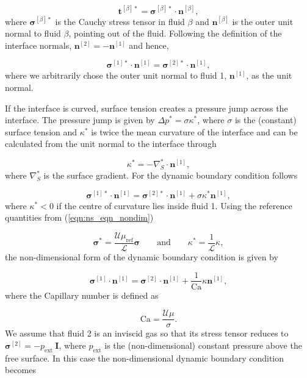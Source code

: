 \documentclass[aip,graphicx]{revtex4-1}
\newcommand{\sym}[1]{\text{#1}}
\newcommand{\vect}[1]{\bm{#1}}
\begin{document}
\begin{equation}
 \vect{t}^{[\beta]*} = \vect{\sigma}^{[\beta]*} \cdot \vect{n}^{[\beta]},
\end{equation}
where $\vect{\sigma}^{[\beta]*}$ is the Cauchy stress tensor in fluid $\beta$ and $\vect{n}^{[\beta]}$ is the outer unit normal to fluid $\beta$, pointing out of the fluid. 
Following the definition of the interface normals, $\vect{n}^{[2]} = - \vect{n}^{[1]}$ and hence,

\begin{equation}
 \vect{\sigma}^{[1]*} \cdot \vect{n}^{[1]} = \vect{\sigma}^{[2]*} \cdot \vect{n}^{[1]},
\end{equation}
where we arbitrarily chose the outer unit normal to fluid 1, $\vect{n}^{[1]}$, as the unit normal.


If the interface is curved, surface tension creates a pressure jump across the interface. 
The pressure jump is given by $\Delta p^* = \sigma \kappa^*$, where $\sigma$ is the (constant) surface tension and $\kappa^*$ is twice the mean curvature of the interface and can be calculated from the unit normal to the interface through

\begin{equation}
 \kappa^* = - \nabla_S^* \cdot \vect{n}^{[1]},
\end{equation}
where $\nabla_S^*$ is the surface gradient. 
For the dynamic boundary condition follows

\begin{equation}
 \vect{\sigma}^{[1]*} \cdot \vect{n}^{[1]} = \vect{\sigma}^{[2]*} \cdot \vect{n}^{[1]} + \sigma \kappa^* \vect{n}^{[1]},
\end{equation}
where $\kappa^* < 0$ if the centre of curvature lies inside fluid 1.
Using the reference quantities from (\ref{eqn:ns_eqn_nondim})

\begin{equation}
 \vect{\sigma}^*= \frac{\mathcal{U} \mu_{\sym{ref}}}{\mathcal{L}} \vect{\sigma} \qquad \text{and} \qquad \kappa^*= \frac{1}{\mathcal{L}} \kappa,
\end{equation}
the non-dimensional form of the dynamic boundary condition is given by

\begin{equation}
 \vect{\sigma}^{[1]} \cdot \vect{n}^{[1]} = \vect{\sigma}^{[2]} \cdot \vect{n}^{[1]} + \frac{1}{\sym{Ca}} \kappa \vect{n}^{[1]},
\end{equation}
where the Capillary number is defined as

\begin{equation}
 \sym{Ca} = \frac{\mathcal{U} \mu}{\sigma}.
\end{equation}
We assume that fluid 2 is an inviscid gas so that its stress tensor reduces to $\vect{\sigma}^{[2]}=-p_{\sym{ext}} \: \vect{I}$, where $p_{\sym{ext}}$ is the (non-dimensional) constant pressure above the free surface. 
In this case the non-dimensional dynamic boundary condition becomes
\end{document}
